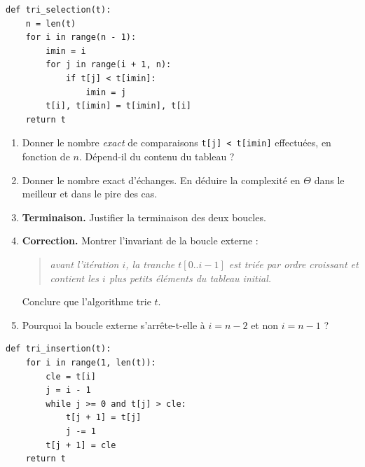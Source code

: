 \documentclass[11pt,a4paper]{article}
\begin{document}

\begin{lstlisting}
def tri_selection(t):
    n = len(t)
    for i in range(n - 1):
        imin = i
        for j in range(i + 1, n):
            if t[j] < t[imin]:
                imin = j
        t[i], t[imin] = t[imin], t[i]
    return t
\end{lstlisting}

\begin{enumerate}[label=\arabic*.,leftmargin=*]
  \item Donner le nombre \emph{exact} de comparaisons \texttt{t[j] < t[imin]} effectuées,
        en fonction de $n$. Dépend-il du contenu du tableau ?
  \item Donner le nombre exact d'échanges. En déduire la complexité en $\Theta$
        dans le meilleur et dans le pire des cas.
  \item \textbf{Terminaison.} Justifier la terminaison des deux boucles.
  \item \textbf{Correction.} Montrer l'invariant de la boucle externe :
        \begin{quote}
          \emph{avant l'itération $i$, la tranche $t[0..i-1]$ est triée par ordre
          croissant et contient les $i$ plus petits éléments du tableau initial.}
        \end{quote}
        Conclure que l'algorithme trie $t$.
  \item Pourquoi la boucle externe s'arrête-t-elle à $i=n-2$ et non $i=n-1$ ?
\end{enumerate}

\begin{lstlisting}
def tri_insertion(t):
    for i in range(1, len(t)):
        cle = t[i]
        j = i - 1
        while j >= 0 and t[j] > cle:
            t[j + 1] = t[j]
            j -= 1
        t[j + 1] = cle
    return t
\end{lstlisting}
\end{document}
